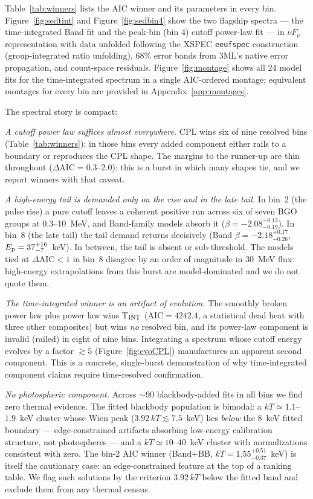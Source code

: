 \documentclass[twocolumn]{aastex631}
\begin{document}
Table~\ref{tab:winners} lists the AIC winner and its parameters in every bin.
Figure~\ref{fig:sedtint} and Figure~\ref{fig:sedbin4} show the two flagship
spectra --- the time-integrated Band fit and the peak-bin (bin 4) cutoff
power-law fit --- in $\nu F_\nu$ representation with data unfolded following
the XSPEC \texttt{eeufspec} construction (group-integrated ratio unfolding),
68\% error bands from 3ML's native error propagation, and count-space
residuals. Figure~\ref{fig:montage} shows all 24 model fits for the
time-integrated spectrum in a single AIC-ordered montage; equivalent montages
for every bin are provided in Appendix~\ref{app:montages}.

The spectral story is compact:

\textit{A cutoff power law suffices almost everywhere.} CPL wins six of nine
resolved bins (Table~\ref{tab:winners}); in those bins every added component
either rails to a boundary or reproduces the CPL shape. The margins to the
runner-up are thin throughout ($\Delta\mathrm{AIC} = 0.3$--$2.0$): this is a
burst in which many shapes tie, and we report winners with that caveat.

\textit{A high-energy tail is demanded only on the rise and in the late
tail.} In bin~2 (the pulse rise) a pure cutoff leaves a coherent positive run
across six of seven BGO groups at 0.3--10~MeV, and Band-family models absorb
it ($\beta = -2.08^{+0.13}_{-0.19}$). In bin~8 (the late tail) the tail
demand returns decisively (Band $\beta = -2.18^{+0.17}_{-0.26}$,
$E_{\rm p} = 37^{+16}_{-7}$~keV). In between, the tail is absent or
sub-threshold. The models tied at $\Delta\mathrm{AIC} < 1$ in bin~8 disagree
by an order of magnitude in 30~MeV flux: high-energy extrapolations from this
burst are model-dominated and we do not quote them.

\textit{The time-integrated winner is an artifact of evolution.} The
smoothly broken power law plus power law wins T$_{\rm INT}$
($\mathrm{AIC} = 4242.4$, a statistical dead heat with three other
composites) but wins \emph{no} resolved bin, and its power-law component is
invalid (railed) in eight of nine bins. Integrating a spectrum whose cutoff
energy evolves by a factor $\gtrsim 5$ (Figure~\ref{fig:evoCPL}) manufactures an
apparent second component. This is a concrete, single-burst demonstration of
why time-integrated component claims require time-resolved confirmation.

\textit{No photospheric component.} Across $\sim$90 blackbody-added fits in
all bins we find zero thermal evidence. The fitted blackbody population is
bimodal: a $kT \simeq 1.1$--$1.9$~keV cluster whose Wien peak
($3.92\,kT \lesssim 7.5$~keV) lies \emph{below} the 8~keV fitted boundary ---
edge-constrained artifacts absorbing low-energy calibration structure, not
photospheres --- and a $kT \simeq 10$--$40$~keV cluster with normalizations
consistent with zero. The bin-2 AIC winner (Band+BB,
$kT = 1.55^{+0.51}_{-0.37}$~keV) is itself the cautionary case: an
edge-constrained feature at the top of a ranking table. We flag such
solutions by the criterion $3.92\,kT$ below the fitted band and exclude them
from any thermal census.
\end{document}
